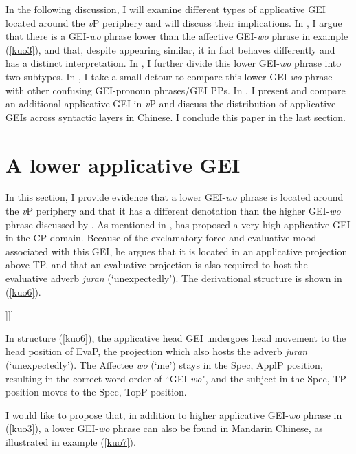 \documentclass[output=paper,colorlinks,citecolor=brown]{langscibook}
\begin{document}
In the following discussion, I will examine different types of applicative GEI located around the \textit{v}P periphery and will discuss their implications. In , I argue that there is a GEI-\textit{wo} phrase lower than the affective GEI-\textit{wo} phrase in example (\ref{kuo3}), and that, despite appearing similar, it in fact behaves differently and has a distinct interpretation. In , I further divide this lower GEI-\textit{wo} phrase into two subtypes. In , I take a small detour to compare this lower GEI-\textit{wo} phrase with other confusing GEI-pronoun phrases/GEI PPs. In , I present and compare an additional applicative GEI in \textit{v}P and discuss the distribution of applicative GEIs across syntactic layers in Chinese. I conclude this paper in the last section.

\section{A lower applicative GEI}\label{sect2}

In this section, I provide evidence that a lower GEI-\textit{wo} phrase is located around the \textit{v}P periphery and that it has a different denotation than the higher GEI-\textit{wo} phrase discussed by \citet{Tsai2017}. As mentioned in  , \citet{Tsai2017} has proposed a very high applicative GEI in the CP domain. Because of the
exclamatory force and evaluative mood associated with this GEI, he argues that it is located in an applicative projection above TP, and that an evaluative projection is also required to host the evaluative adverb \textit{juran} (`unexpectedly'). The derivational structure is shown in (\ref{kuo6}).

\ea
\label{kuo6}
\glt [\textsubscript{TopP} Zhangsan\textsubscript{i}  [\textsubscript{EvaP}   juran gei\textsubscript{j}  [\textsubscript{ApplP}  wo  t\textsubscript{j}  [\textsubscript{TP}  t\textsubscript{i}  ......]]]]\\  
\z

In structure (\ref{kuo6}), the applicative head GEI undergoes head movement to the head position of EvaP, the projection which also hosts the adverb \textit{juran} (`unexpectedly'). The Affectee \textit{wo} (`me') stays in the Spec, ApplP position, resulting in the correct word order of “GEI-\textit{wo}", and the subject in the Spec, TP position moves to the Spec, TopP position.
 
I would like to propose that, in addition to  \citeyear{Tsai2017} higher applicative GEI-\textit{wo} phrase in (\ref{kuo3}), a lower GEI-\textit{wo} phrase can also be found in Mandarin Chinese, as illustrated in example (\ref{kuo7}).
\end{document}
